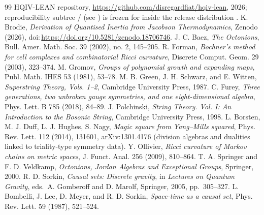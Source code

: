 \documentclass[11pt]{amsart}
\begin{document}
\begin{thebibliography}{99}
HQIV-LEAN repository, \url{https://github.com/disregardfiat/hqiv-lean}, 2026; reproducibility subtree \PaperReproBundleDir/ (see \PaperReproBundleManifest) is frozen for  inside the release distribution \ReleaseDistArchive{}.
K. Brodie, \emph{Derivation of Quantised Inertia from Jacobson Thermodynamics}, Zenodo (2026), doi:\,\url{https://doi.org/10.5281/zenodo.18706746}.
J. C. Baez, \emph{The Octonions}, Bull. Amer. Math. Soc. 39 (2002), no. 2, 145--205.
R. Forman, \emph{Bochner's method for cell complexes and combinatorial Ricci curvature}, Discrete Comput. Geom. 29 (2003), 323--374.
M. Gromov, \emph{Groups of polynomial growth and expanding maps}, Publ. Math. IHES 53 (1981), 53--78.
M. B. Green, J. H. Schwarz, and E. Witten, \emph{Superstring Theory, Vols. 1--2}, Cambridge University Press, 1987.
C. Furey, \emph{Three generations, two unbroken gauge symmetries, and one eight-dimensional algebra}, Phys. Lett. B 785 (2018), 84--89.
J. Polchinski, \emph{String Theory. Vol. I: An Introduction to the Bosonic String}, Cambridge University Press, 1998.
L. Borsten, M. J. Duff, L. J. Hughes, S. Nagy, \emph{Magic square from Yang--Mills squared}, Phys. Rev. Lett. 112 (2014), 131601, arXiv:1301.4176 (division algebras and dualities linked to triality-type symmetry data).
Y. Ollivier, \emph{Ricci curvature of Markov chains on metric spaces}, J. Funct. Anal. 256 (2009), 810--864.
T. A. Springer and F. D. Veldkamp, \emph{Octonions, Jordan Algebras and Exceptional Groups}, Springer, 2000.
R. D. Sorkin, \emph{Causal sets: Discrete gravity}, in \emph{Lectures on Quantum Gravity}, eds.\ A. Gomberoff and D. Marolf, Springer, 2005, pp.\ 305--327.
L. Bombelli, J. Lee, D. Meyer, and R. D. Sorkin, \emph{Space-time as a causal set}, Phys. Rev. Lett. 59 (1987), 521--524.
\end{thebibliography}
\end{document}
